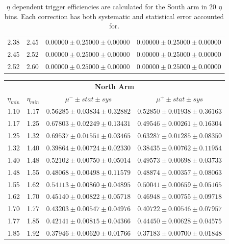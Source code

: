 \begin{table}
\begin{tabular}{cccc}
    2.38 & 2.45 & $0.00000 \pm 0.25000 \pm 0.00000$ & $0.00000 \pm 0.25000 \pm 0.00000$ \\
    2.45 & 2.52 & $0.00000 \pm 0.25000 \pm 0.00000$ & $0.00000 \pm 0.25000 \pm 0.00000$ \\
    2.52 & 2.60 & $0.00000 \pm 0.25000 \pm 0.00000$ & $0.00000 \pm 0.25000 \pm 0.00000$ \\
    \bottomrule
  \end{tabular}
  \caption{
    $\eta$ dependent trigger efficiencies are calculated for the South arm in 20
    $\eta$ bins. Each correction has both systematic and statistical error
    accounted for.
  }
  \label{tab:rapidity_corrections_south}
\end{table}

\begin{table}
  \centering
  \begin{tabular}{cccc}
    \toprule
    \multicolumn{4}{c}{\textbf{North Arm}} \\
    \textbf{$\eta_{min}$} & 
    \textbf{$\eta_{min}$} & 
    \textbf{$\mu^{-}\pm stat \pm sys$} & 
    \textbf{$\mu^{+}\pm stat \pm sys$} \\
    \midrule
    1.10 & 1.17 & $0.56285 \pm 0.03834 \pm 0.32882$ & $0.52850 \pm 0.01938 \pm 0.36163$ \\
    1.17 & 1.25 & $0.67803 \pm 0.02249 \pm 0.13431$ & $0.49546 \pm 0.00261 \pm 0.16304$ \\
    1.25 & 1.32 & $0.69537 \pm 0.01551 \pm 0.03465$ & $0.63287 \pm 0.01285 \pm 0.08350$ \\
    1.32 & 1.40 & $0.39864 \pm 0.00724 \pm 0.02330$ & $0.38435 \pm 0.00762 \pm 0.11954$ \\
    1.40 & 1.48 & $0.52102 \pm 0.00750 \pm 0.05014$ & $0.49573 \pm 0.00698 \pm 0.03733$ \\
    1.48 & 1.55 & $0.48068 \pm 0.00498 \pm 0.11579$ & $0.48874 \pm 0.00357 \pm 0.08063$ \\
    1.55 & 1.62 & $0.54113 \pm 0.00860 \pm 0.04895$ & $0.50041 \pm 0.00659 \pm 0.05165$ \\
    1.62 & 1.70 & $0.45140 \pm 0.00822 \pm 0.05718$ & $0.46948 \pm 0.00755 \pm 0.09718$ \\
    1.70 & 1.77 & $0.43203 \pm 0.00547 \pm 0.04976$ & $0.40722 \pm 0.00546 \pm 0.07957$ \\
    1.77 & 1.85 & $0.42141 \pm 0.00815 \pm 0.04366$ & $0.44450 \pm 0.00628 \pm 0.04575$ \\
    1.85 & 1.92 & $0.37946 \pm 0.00620 \pm 0.01766$ & $0.37183 \pm 0.00700 \pm 0.01848$ \\

\end{tabular}
\end{table}
